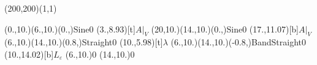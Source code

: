 \unitlength=1bp%

\begin{feynartspicture}(200,200)(1,1)

\FADiagram{}
\FAProp(0.,10.)(6.,10.)(0.,){Sine}{0}
\FALabel(3.,8.93)[t]{$A|_V$}
\FAProp(20,10.)(14.,10.)(0.,){Sine}{0}
\FALabel(17.,11.07)[b]{$A|_V$}
\FAProp(6.,10.)(14.,10.)(0.8,){Straight}{0}
\FALabel(10.,5.98)[t]{$\lambda$}
\FAProp(6.,10.)(14.,10.)(-0.8,){BandStraight}{0}
\FALabel(10.,14.02)[b]{$L_\varepsilon$}
\FAVert(6.,10.){0}
\FAVert(14.,10.){0}
\end{feynartspicture}

